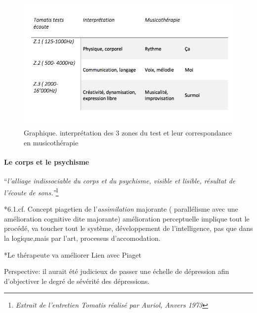 \begin{enumerate}
\begin{figure}
	\centering
	\includegraphics[width=0.7\linewidth]{images/testinterpmusico}
	\caption[ L'interprétation des 3 zones et leur correspondance
        en musicothérapie]{Graphique. interprétation des 3 zones du
          test et leur correspondance en musicothérapie}
       
	\label{graphiquecolonnetestmusico}
      \end{figure}


\paragraph{Le corps et le psychisme}

``\emph{l'alliage indissociable du corps et du psychisme, 
visible et lisible, résultat de l'écoute de sons.''}\footnote{\emph{Extrait de l'entretien Tomatis réalisé par Auriol, Anvers 1973}}




*6.1.cf. Concept piagetien de l'\textit{assimilation} majorante (
parallélisme avec une amélioration cognitive dite majorante)
amélioration perceptuelle implique tout le procédé, va toucher tout le
système, développement de l'intelligence, pas que dans la logique,mais
par l'art, 
processus d'accomodation.


*Le thérapeute va améliorer
Lien avec Piaget

Perspective: il aurait été judicieux de passer une échelle de
     dépression afin d'objectiver le degré de sévérité des
     dépressions.






      


  
 	
 	
 	
 
       
   
 






\end{enumerate}
